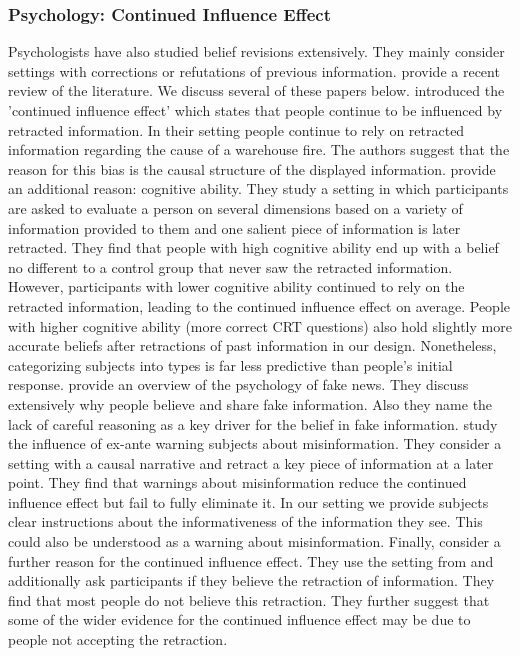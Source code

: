 \documentclass{article}
\begin{document}
\subsubsection*{Psychology: Continued Influence Effect}

Psychologists have also studied belief revisions extensively. They mainly consider settings with corrections or refutations of previous information. \cite{Ecker2022} provide a recent review of the literature. We discuss several of these papers below. \cite{Johnson1994} introduced the 'continued influence effect' which states that people continue to be influenced by retracted information. In their setting people continue to rely on retracted information regarding the cause of a warehouse fire. The authors suggest that the reason for this bias is the causal structure of the displayed information. \cite{Roets2017} provide an additional reason: cognitive ability. They study a setting in which participants are asked to evaluate a person on several dimensions based on a variety of information provided to them and one salient piece of information is later retracted. They find that people with high cognitive ability end up with a belief no different to a control group that never saw the retracted information. However, participants with lower cognitive ability continued to rely on the retracted information, leading to the continued influence effect on average. People with higher cognitive ability (more correct CRT questions) also hold slightly more accurate beliefs after retractions of past information in our design. Nonetheless, categorizing subjects into types is far less predictive than people's initial response. \cite{Pennycook2021} provide an overview of the psychology of fake news. They discuss extensively why people believe and share fake information. Also they name the lack of careful reasoning as a key driver for the belief in fake information. \cite{Ecker2010} study the influence of ex-ante warning subjects about misinformation. They consider a setting with a causal narrative and retract a key piece of information at a later point. They find that warnings about misinformation reduce the continued influence effect but fail to fully eliminate it. In our setting we provide subjects clear instructions about the informativeness of the information they see. This could also be understood as a warning about misinformation. Finally, \cite{Orear2020} consider a further reason for the continued influence effect. They use the setting from \cite{Ecker2010} and additionally ask participants if they believe the retraction of information. They find that most people do not believe this retraction. They further suggest that some of the wider evidence for the continued influence effect may be due to people not accepting the retraction.
\end{document}
